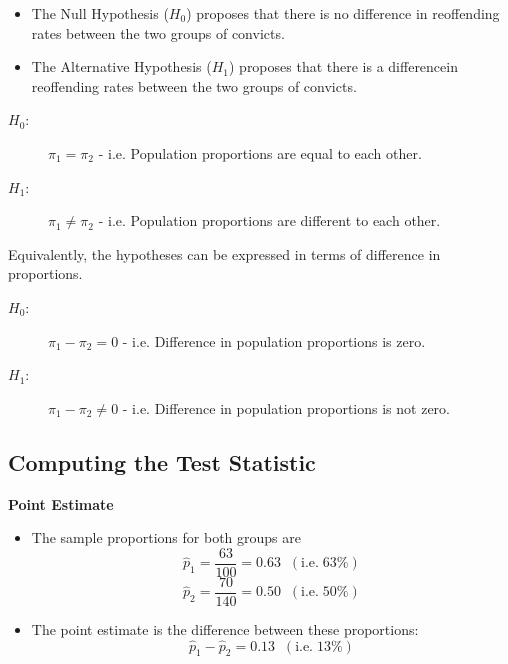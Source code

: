 \documentclass[a4paper,12pt]{article}
\begin{document}
\begin{itemize}
    \item The Null Hypothesis ($H_0$) proposes that there is no difference in reoffending rates between the two groups of convicts.
    \item The Alternative Hypothesis ($H_1$) proposes that there is a differencein reoffending rates between the two groups of convicts.
\end{itemize}
\medskip 
\begin{description}
\item[$H_0$:] $\pi_1 = \pi_2$  - i.e. Population proportions are equal to each other.
\item[$H_1$:] $\pi_1 \neq \pi_2$ - i.e. Population proportions are different to each other.
\end{description}
\medskip
\noindent Equivalently, the hypotheses can be expressed in terms of difference in proportions.
\begin{description}
\item[$H_0$:] $\pi_1 - \pi_2= 0 $ - i.e. Difference in population proportions is zero.
\item[$H_1$:] $\pi_1 - \pi_2 \neq 0$ - i.e. Difference in population proportions is not zero.
\end{description}
\newpage
\subsection*{Computing the Test Statistic}
\noindent \textbf{Point Estimate}

\begin{itemize}
     \item The sample proportions for both groups are
    \[ \hat{p}_1 = \frac{63}{100} = 0.63 \;\;(\mbox{i.e.}\; 63\%) \] 
    \[ \hat{p}_2 = \frac{70}{140} = 0.50 \;\;(\mbox{i.e.}\; 50\%) \]  
    \item The point estimate is the difference between these proportions:
    \[ \hat{p}_1  - \hat{p}_2  = 0.13 \;\;(\mbox{i.e.}\; 13\%) \]
\end{itemize}
\end{document}
